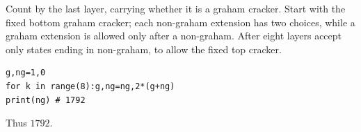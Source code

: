 Count by the last layer, carrying whether it is a graham cracker. Start with the fixed bottom graham cracker; each non-graham extension has two choices, while a graham extension is allowed only after a non-graham. After eight layers accept only states ending in non-graham, to allow the fixed top cracker.\begin{verbatim}
g,ng=1,0
for k in range(8):g,ng=ng,2*(g+ng)
print(ng) # 1792
\end{verbatim}
Thus $\boxed{1792}$.

